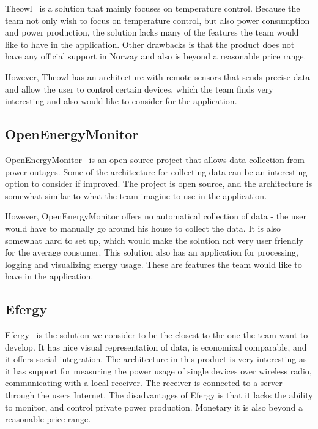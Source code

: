 Theowl~\cite{theowl} is a solution that mainly focuses on temperature control. 
Because the team not only wish to focus on temperature control, but also power consumption and power production, the solution lacks many of the features the team would like to have in the application. Other drawbacks is that the product does not have any official support in Norway and also is beyond a reasonable price range.

However, Theowl has an architecture with remote sensors that sends precise data and allow the user to control certain devices, which the team finds very interesting and also would like to consider for the application.


\subsection{OpenEnergyMonitor}

OpenEnergyMonitor~\cite{openenergymonitor} is an open source project that allows data collection from power outages. Some of the architecture for collecting data can be an interesting option to consider if improved. The project is open source, and the architecture is somewhat similar to what the team imagine to use in the application. 

However, OpenEnergyMonitor offers no automatical collection of data - the user would have to manually go around his house to collect the data. It is also somewhat hard to set up, which would make the solution not very user friendly for the average consumer. This solution also has an application for processing, logging and visualizing energy usage. These are features the team would like to have in the application.



\subsection{Efergy}

Efergy~\cite{efergy} is the solution we consider to be the closest to the one the team want to develop. It has nice visual representation of data, is economical comparable, and it offers social integration. The architecture in this product is very interesting as it has support for measuring the power usage of single devices over wireless radio, communicating with a local receiver. The receiver is connected to a server through the users Internet. The disadvantages of Efergy is that it lacks the ability to monitor, and control private power production. Monetary it is also beyond a reasonable price range.


